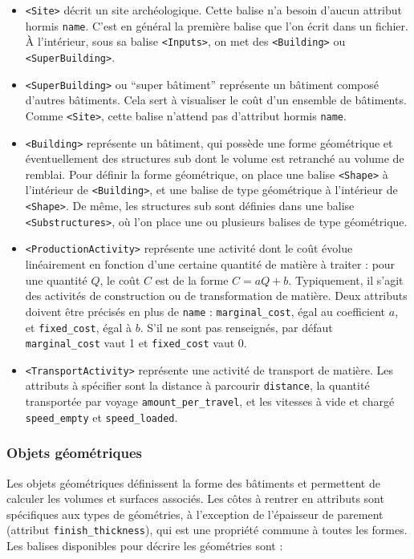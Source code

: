 \documentclass{article}
\begin{document}
\begin{itemize}
 \item \texttt{<Site>} décrit un site archéologique. Cette balise n'a besoin d'aucun attribut hormis \texttt{name}. C'est en général la première balise que l'on écrit dans un fichier. À l'intérieur, sous sa balise \texttt{<Inputs>}, on met des \texttt{<Building>} ou \texttt{<SuperBuilding>}.
 
 \item \texttt{<SuperBuilding>} ou ``super bâtiment'' représente un bâtiment composé d'autres bâtiments. Cela sert à visualiser le coût d'un ensemble de bâtiments. Comme \texttt{<Site>}, cette balise n'attend pas d'attribut hormis \texttt{name}.
 
 \item \texttt{<Building>} représente un bâtiment, qui possède une forme géométrique et éventuellement des structures sub dont le volume est retranché au volume de remblai. Pour définir la forme géométrique, on place une balise \texttt{<Shape>} à l'intérieur de \texttt{<Building>}, et une balise de type géométrique à l'intérieur de \texttt{<Shape>}. De même, les structures sub sont définies dans une balise \texttt{<Substructures>}, où l'on place une ou plusieurs balises de type géométrique.
 
 \item \texttt{<ProductionActivity>} représente une activité dont le coût évolue liné\-airement en fonction d'une certaine quantité de matière à traiter : pour une quantité $Q$, le coût $C$ est de la forme $C = aQ+b$. Typiquement, il s'agit des activités de construction ou de transformation de matière. Deux attributs doivent être précisés en plus de \texttt{name} : \texttt{marginal\_cost}, égal au coefficient $a$, et \texttt{fixed\_cost}, égal à $b$. S'il ne sont pas renseignés, par défaut \texttt{marginal\_cost} vaut 1 et \texttt{fixed\_cost} vaut 0.
 
 \item \texttt{<TransportActivity>} représente une activité de transport de matière. Les attributs à spécifier sont la distance à parcourir \texttt{distance}, la quantité transportée par voyage \texttt{amount\_per\_travel}, et les vitesses à vide et chargé \texttt{speed\_empty} et \texttt{speed\_loaded}.
\end{itemize}

\subsubsection{Objets géométriques}
Les objets géométriques définissent la forme des bâtiments et permettent de calculer les volumes et surfaces associés. Les côtes à rentrer en attributs sont spécifiques aux types de géométries, à l'exception de l'épaisseur de parement (attribut \texttt{finish\_thickness}), qui est une propriété commune à toutes les formes.
Les balises disponibles pour décrire les géométries sont :
\end{document}
